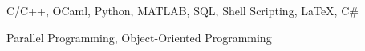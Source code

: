 

\begin{cventries}

\cvskills
  {
    \begin{cvitems} %
      \item {C/C++, OCaml, Python, MATLAB, SQL, Shell Scripting, LaTeX, C\#} %
      \item {Parallel Programming, Object-Oriented Programming}
    \end{cvitems}
  }
\end{cventries}
